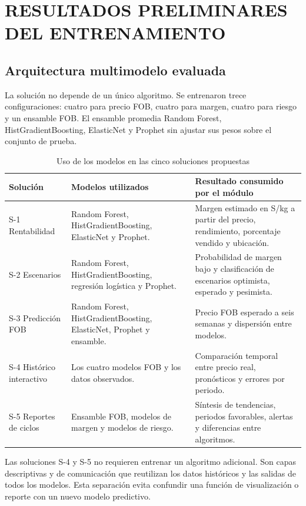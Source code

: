 \chapter{RESULTADOS PRELIMINARES DEL ENTRENAMIENTO}

\section{Arquitectura multimodelo evaluada}

La solución no depende de un único algoritmo. Se entrenaron trece configuraciones: cuatro para precio FOB, cuatro para margen, cuatro para riesgo y un ensamble FOB. El ensamble promedia Random Forest, HistGradientBoosting, ElasticNet y Prophet sin ajustar sus pesos sobre el conjunto de prueba.

\begin{table}[H]
\centering
\caption{Uso de los modelos en las cinco soluciones propuestas}
\label{tab:arquitectura_multimodelo}
\begin{singlespace}
\scriptsize
\renewcommand{\arraystretch}{1.05}
\begin{tabular}{p{2.7cm}p{4.1cm}p{5.6cm}}
\toprule
\textbf{Solución} & \textbf{Modelos utilizados} & \textbf{Resultado consumido por el módulo} \\
\midrule
S-1 Rentabilidad & Random Forest, HistGradientBoosting, ElasticNet y Prophet. & Margen estimado en S/kg a partir del precio, rendimiento, porcentaje vendido y ubicación. \\
S-2 Escenarios & Random Forest, HistGradientBoosting, regresión logística y Prophet. & Probabilidad de margen bajo y clasificación de escenarios optimista, esperado y pesimista. \\
S-3 Predicción FOB & Random Forest, HistGradientBoosting, ElasticNet, Prophet y ensamble. & Precio FOB esperado a seis semanas y dispersión entre modelos. \\
S-4 Histórico interactivo & Los cuatro modelos FOB y los datos observados. & Comparación temporal entre precio real, pronósticos y errores por periodo. \\
S-5 Reportes de ciclos & Ensamble FOB, modelos de margen y modelos de riesgo. & Síntesis de tendencias, periodos favorables, alertas y diferencias entre algoritmos. \\
\bottomrule
\end{tabular}
\end{singlespace}
\end{table}

Las soluciones S-4 y S-5 no requieren entrenar un algoritmo adicional. Son capas descriptivas y de comunicación que reutilizan los datos históricos y las salidas de todos los modelos. Esta separación evita confundir una función de visualización o reporte con un nuevo modelo predictivo.

